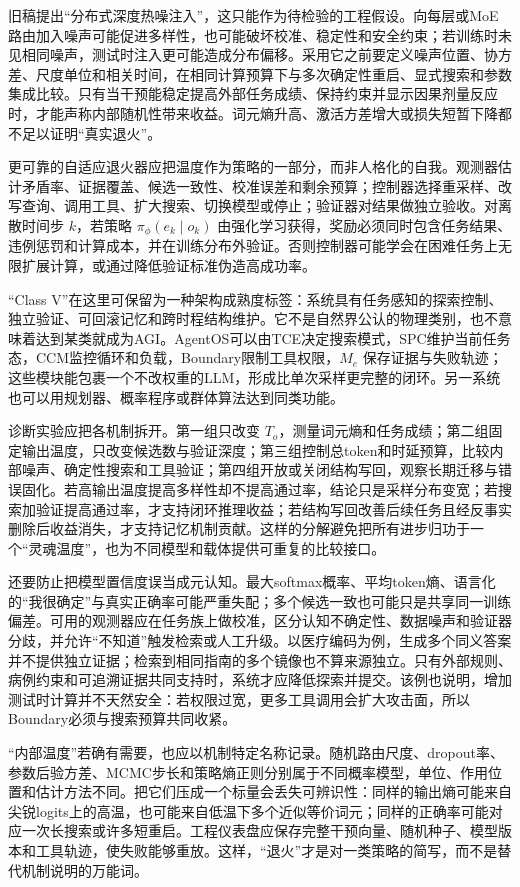 旧稿提出“分布式深度热噪注入”，这只能作为待检验的工程假设。向每层或MoE路由加入噪声可能促进多样性，也可能破坏校准、稳定性和安全约束；若训练时未见相同噪声，测试时注入更可能造成分布偏移。采用它之前要定义噪声位置、协方差、尺度单位和相关时间，在相同计算预算下与多次确定性重启、显式搜索和参数集成比较。只有当干预能稳定提高外部任务成绩、保持约束并显示因果剂量反应时，才能声称内部随机性带来收益。词元熵升高、激活方差增大或损失短暂下降都不足以证明“真实退火”。

更可靠的自适应退火器应把温度作为策略的一部分，而非人格化的自我。观测器估计矛盾率、证据覆盖、候选一致性、校准误差和剩余预算；控制器选择重采样、改写查询、调用工具、扩大搜索、切换模型或停止；验证器对结果做独立验收。对离散时间步 $k$，若策略 $\pi_\phi(e_k\mid o_k)$ 由强化学习获得，奖励必须同时包含任务结果、违例惩罚和计算成本，并在训练分布外验证。否则控制器可能学会在困难任务上无限扩展计算，或通过降低验证标准伪造高成功率。

“Class V”在这里可保留为一种架构成熟度标签：系统具有任务感知的探索控制、独立验证、可回滚记忆和跨时程结构维护。它不是自然界公认的物理类别，也不意味着达到某类就成为AGI。AgentOS可以由TCE决定搜索模式，SPC维护当前任务态，CCM监控循环和负载，Boundary限制工具权限，$M_e$ 保存证据与失败轨迹；这些模块能包裹一个不改权重的LLM，形成比单次采样更完整的闭环。另一系统也可以用规划器、概率程序或群体算法达到同类功能。

诊断实验应把各机制拆开。第一组只改变 $T_o$，测量词元熵和任务成绩；第二组固定输出温度，只改变候选数与验证深度；第三组控制总token和时延预算，比较内部噪声、确定性搜索和工具验证；第四组开放或关闭结构写回，观察长期迁移与错误固化。若高输出温度提高多样性却不提高通过率，结论只是采样分布变宽；若搜索加验证提高通过率，才支持闭环推理收益；若结构写回改善后续任务且经反事实删除后收益消失，才支持记忆机制贡献。这样的分解避免把所有进步归功于一个“灵魂温度”，也为不同模型和载体提供可重复的比较接口。

还要防止把模型置信度误当成元认知。最大softmax概率、平均token熵、语言化的“我很确定”与真实正确率可能严重失配；多个候选一致也可能只是共享同一训练偏差。可用的观测器应在任务族上做校准，区分认知不确定性、数据噪声和验证器分歧，并允许“不知道”触发检索或人工升级。以医疗编码为例，生成多个同义答案并不提供独立证据；检索到相同指南的多个镜像也不算来源独立。只有外部规则、病例约束和可追溯证据共同支持时，系统才应降低探索并提交。该例也说明，增加测试时计算并不天然安全：若权限过宽，更多工具调用会扩大攻击面，所以Boundary必须与搜索预算共同收紧。

“内部温度”若确有需要，也应以机制特定名称记录。随机路由尺度、dropout率、参数后验方差、MCMC步长和策略熵正则分别属于不同概率模型，单位、作用位置和估计方法不同。把它们压成一个标量会丢失可辨识性：同样的输出熵可能来自尖锐logits上的高温，也可能来自低温下多个近似等价词元；同样的正确率可能对应一次长搜索或许多短重启。工程仪表盘应保存完整干预向量、随机种子、模型版本和工具轨迹，使失败能够重放。这样，“退火”才是对一类策略的简写，而不是替代机制说明的万能词。

